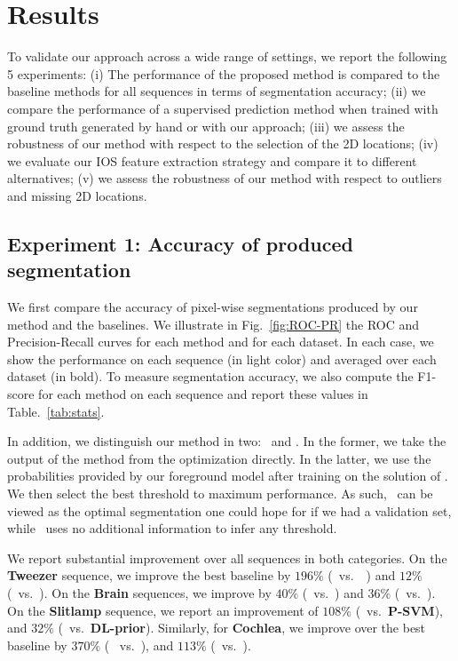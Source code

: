\section{Results}
\label{sec:results}
To validate our approach across a wide range of settings, we report the following 5 experiments: 
(i) The performance of the proposed method is compared to the baseline methods for all sequences in terms of segmentation accuracy; (ii) we compare the performance of a supervised prediction method when trained with ground truth generated by hand or with our approach; (iii) we assess the robustness of our method with respect to the selection of the 2D locations; (iv) we evaluate our IOS feature extraction strategy and compare it to different alternatives; (v) we assess the robustness of our method with respect to outliers and missing 2D locations.

\subsection{Experiment 1: Accuracy of produced segmentation}
\label{sec:accuracy}
We first compare the accuracy of pixel-wise segmentations produced by our method and the baselines.
We illustrate in Fig.~\ref{fig:ROC-PR} the ROC and Precision-Recall curves for each method and for each dataset. In each case, we show the performance on each sequence (in light color) and averaged over each dataset (in bold). To measure segmentation accuracy, we also compute the F1-score for each method on each sequence and report these values in Table.~\ref{tab:stats}.

In addition, we distinguish our method in two: \KSP ~and \KSPOPT. In the former, we take the output of the method from the optimization directly. In the latter, we use the probabilities provided by our foreground model after training on the solution of \KSP. We then select the best threshold to maximum performance. As such, \KSPOPT ~can be viewed as the optimal segmentation one could hope for if we had a validation set, while \KSP ~uses no additional information to infer any threshold.

We report substantial improvement over all sequences in both categories. On the {\bf Tweezer} sequence, we improve the best baseline by
$196\%$ (\KSP ~vs.~\PSVM ~) and $12\%$ (\KSPOPT ~vs.~\DL). On the {\bf Brain} sequences, we improve by $40\%$ (\KSP ~vs.~\PSVM) and $36\%$ (\KSPOPT ~vs.~\DL).
On the {\bf Slitlamp} sequence, we report an improvement of $108\%$ (\KSP ~vs.~{\bf P-SVM}), and $32\%$ (\KSPOPT ~vs.~{\bf DL-prior}).
Similarly, for {\bf Cochlea}, we improve over the best baseline by $370\%$ (\KSP ~ vs.~\PSVM), and $113\%$ (\KSPOPT ~vs.~\DL).

